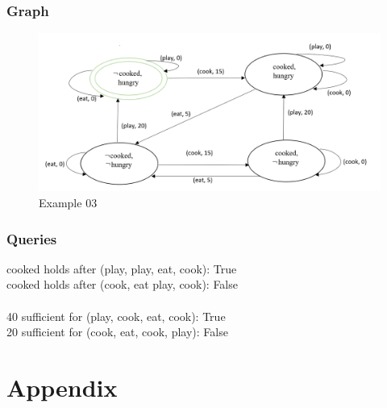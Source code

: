 \documentclass[11pt]{article}
\begin{document}
	\subsubsection{Graph}\label{par:p403}
	\begin{figure}[H]
		\includegraphics[width=1\linewidth, height=0.3\textheight]{./media/figure01.png}
		\caption{Example 03}
		\label{Figure:f03}
	\end{figure}
	\subsubsection{Queries}
	cooked holds after (play, play, eat, cook): True\\
	cooked holds after (cook, eat play, cook): False\\
	\\
	40 sufficient for (play, cook, eat, cook): True\\
	20 sufficient for (cook, eat, cook, play): False\\
	\newpage
	\section{Appendix}	
	\begin{appendix}
		\listoffigures
		\listoftables
	\end{appendix}
\end{document}
